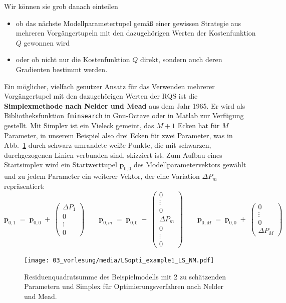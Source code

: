Wir können sie grob danach einteilen
\begin{itemize}
\item ob das nächste Modellparametertupel gemäß einer gewissen Strategie aus
mehreren Vor\-gänger\-tupeln mit den dazugehörigen Werten der Kostenfunktion $Q$ gewonnen wird
\item oder ob nicht nur die Kostenfunktion $Q$ direkt, sondern auch deren Gradienten bestimmt
werden.
\end{itemize}
Ein möglicher, vielfach genutzer Ansatz für das Verwenden mehrerer Vorgängertupel mit den dazugehörigen Werten der RQS
ist die \textbf{Simplexmethode nach Nelder und Mead} aus dem Jahr 1965. Er wird als Bibliotheksfunktion \texttt{fminsearch} in Gnu-Octave oder
in Matlab zur Verfügung gestellt. Mit Simplex ist ein Vieleck gemeint, das $M+1$ Ecken hat für $M$
Parameter, in unserem Beispiel also drei Ecken für zwei Parameter, was in Abb.~\ref{LSoptiExample1NM} durch
schwarz umrandete weiße Punkte, die mit schwarzen, durchgezogenen Linien verbunden sind, skizziert ist. Zum Aufbau eines
Startsimplex wird ein Startwerttupel $\mathbf{p}_{0,0}$ des Modellparametervektors gewählt und zu jedem Parameter ein
weiterer Vektor, der eine Variation $\Delta P_m$ repräsentiert:
\begin{equation}
\mathbf{p}_{0,1} \; = \; \mathbf{p}_{0,0} \; + \; \left(\begin{array}{c}
\Delta P_1 \\
0 \\
\vdots \\
0
\end{array}\right) \qquad
\mathbf{p}_{0,m} \; = \; \mathbf{p}_{0,0} \; + \; \left(\begin{array}{c}
0 \\
\vdots \\
0 \\
\Delta P_m \\
0 \\
\vdots \\
0
\end{array}\right) \qquad
\mathbf{p}_{0,M} \; = \; \mathbf{p}_{0,0} \; + \; \left(\begin{array}{c}
0 \\
\vdots \\
0 \\
\Delta P_M
\end{array}\right)
\end{equation}
\begin{figure}
\begin{center}
\texttt{[image: 03\_vorlesung/media/LSopti\_example1\_LS\_NM.pdf]}
\end{center}
\caption{Residuenquadratsumme des Beispielmodells mit 2 zu schätzenden Parametern
und Simplex für Optimierungsverfahren nach Nelder und Mead.\label{LSoptiExample1NM}}
\end{figure}


